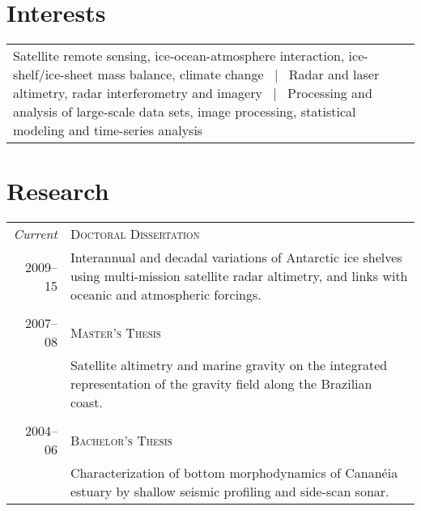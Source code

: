\documentclass[a4paper,11pt]{article}
\begin{document}

\section{Interests}

\begin{tabular}{p{\textwidth}}
Satellite remote sensing, ice-ocean-atmosphere interaction, ice-shelf/ice-sheet mass balance, climate change ~|~ Radar and laser altimetry, radar interferometry and imagery ~|~ Processing and analysis of large-scale data sets, image processing, statistical modeling and time-series analysis
\end{tabular}


\section{Research}

\begin{tabular}{r|p{}}
\emph{Current} & \textsc{Doctoral Dissertation} \\
2009--15 & {Interannual and decadal variations of Antarctic ice shelves using multi-mission satellite radar altimetry, and links with oceanic and atmospheric forcings.}\\
\multicolumn{2}{c}{} \\  %


2007--08 & \textsc{Master's Thesis} \\
& {Satellite altimetry and marine gravity on the integrated representation of the gravity field along the Brazilian coast.}\\
\multicolumn{2}{c}{} \\


2004--06 & \textsc{Bachelor's Thesis} \\
& {Characterization of bottom morphodynamics of Canan\'eia estuary by shallow seismic profiling and side-scan sonar.} \\


\end{tabular}
\end{document}
